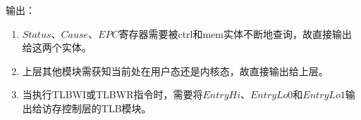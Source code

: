 \documentclass{article}
\begin{document}
\begin{spacing}{1.4}
输出：
\begin{enumerate}
    \item $Status$、$Cause$、$EPC$寄存器需要被ctrl和mem实体不断地查询，故直接输出给这两个实体。
    \item 上层其他模块需获知当前处在用户态还是内核态，故直接输出给上层。
    \item 当执行TLBWI或TLBWR指令时，需要将$EntryHi$、$EntryLo0$和$EntryLo1$输出给访存控制层的TLB模块。
\end{enumerate}


\end{spacing}
\end{document}
